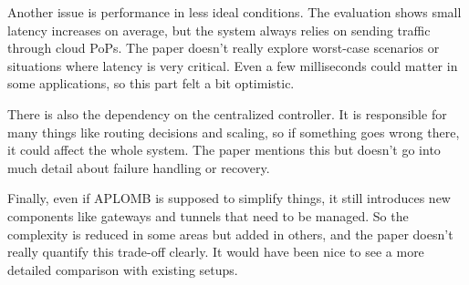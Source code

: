 \documentclass[a4paper, 12pt]{article}
\begin{document}
Another issue is performance in less ideal conditions. The evaluation shows small latency increases on average, but the system always relies on sending traffic through cloud PoPs. The paper doesn't really explore worst-case scenarios or situations where latency is very critical. Even a few milliseconds could matter in some applications, so this part felt a bit optimistic.

There is also the dependency on the centralized controller. It is responsible for many things like routing decisions and scaling, so if something goes wrong there, it could affect the whole system. The paper mentions this but doesn't go into much detail about failure handling or recovery.

Finally, even if APLOMB is supposed to simplify things, it still introduces new components like gateways and tunnels that need to be managed. So the complexity is reduced in some areas but added in others, and the paper doesn’t really quantify this trade-off clearly. It would have been nice to see a more detailed comparison with existing setups.
\end{document}
